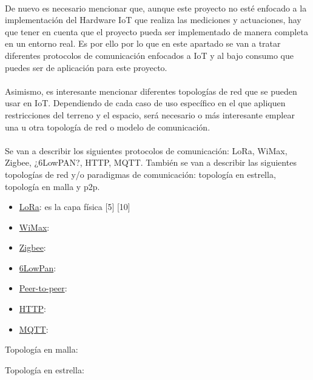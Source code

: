\documentclass[../../memoria.tex]{subfiles}
\begin{document}
\paragraph{}
De nuevo es necesario mencionar que, aunque este proyecto no esté enfocado a la implementación del Hardware IoT que realiza las mediciones y actuaciones, hay que tener en cuenta que el proyecto pueda ser implementado de manera completa en un entorno real. Es por ello por lo que en este apartado se van a tratar diferentes protocolos de comunicación enfocados a IoT y al bajo consumo que puedes ser de aplicación para este proyecto.

\paragraph{}
Asimismo, es interesante mencionar diferentes topologías de red que se pueden usar en IoT. Dependiendo de cada caso de uso específico en el que apliquen restricciones del terreno y el espacio, será necesario o más interesante emplear una u otra topología de red o modelo de comunicación.

\paragraph{}
Se van a describir los siguientes protocolos de comunicación: LoRa, WiMax, Zigbee, ¿6LowPAN?, HTTP, MQTT. También se van a describir las siguientes topologías de red y/o paradigmas de comunicación: topología en estrella, topología en malla y p2p.


\begin{itemize}
    \item \uline{LoRa}: es la capa física [5] [10]

    \item \uline{WiMax}:

    \item \uline{Zigbee}:

    \item \uline{6LowPan}:

    \item \uline{Peer-to-peer}:

    \item \uline{HTTP}:

    \item \uline{MQTT}:

\end{itemize}

Topología en malla:

Topología en estrella:
\end{document}
